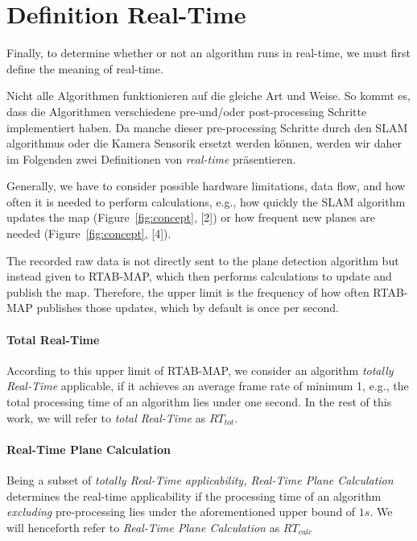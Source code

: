 \documentclass[main.tex]{subfiles}
\begin{document}
\section{Definition Real-Time}\label{sec:realtime}
Finally, to determine whether or not an algorithm runs in real-time, we must first define the meaning of real-time.

Nicht alle Algorithmen funktionieren auf die gleiche Art und Weise. So kommt es, dass die Algorithmen verschiedene pre-und/oder post-processing Schritte 
implementiert haben. Da manche dieser pre-processing Schritte durch den SLAM algorithmus oder die Kamera Sensorik ersetzt werden können, werden wir daher
im Folgenden zwei Definitionen von \textit{real-time} präsentieren.

Generally, we have to consider possible hardware limitations, data flow, and how often it is needed to perform calculations, e.g., how quickly the SLAM algorithm
updates the map (Figure~\ref{fig:concept}, [2]) or how frequent new planes are needed (Figure~\ref{fig:concept}, [4]).

The recorded raw data is not directly sent to the plane detection algorithm but instead given to RTAB-MAP, which then performs
calculations to update and publish the map.
Therefore, the upper limit is the frequency of how often RTAB-MAP publishes those updates, which by default is once per second.

\paragraph{Total Real-Time}
According to this upper limit of RTAB-MAP, we consider an algorithm \textit{totally Real-Time} applicable, if it achieves an average frame
rate of minimum 1, e.g., the total processing time of an algorithm lies under one second. In the rest of this work, we will
refer to \textit{total Real-Time} as $RT_{tot}$.

\paragraph{Real-Time Plane Calculation}
Being a subset of \textit{totally Real-Time applicability, Real-Time Plane Calculation} determines the real-time applicability if the processing time of an algorithm
\textit{excluding} pre-processing lies under the aforementioned upper bound of $1s$. We will henceforth refer to 
\textit{Real-Time Plane Calculation} as $RT_{calc}$
\end{document}
